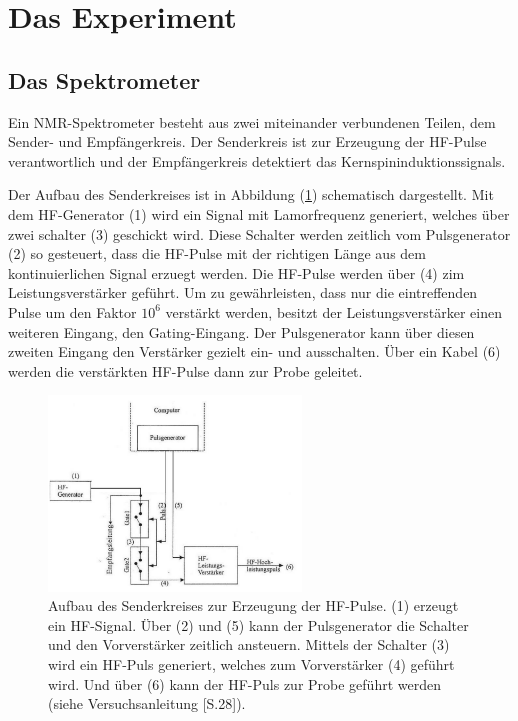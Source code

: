 \section{Das Experiment}
\subsection{Das Spektrometer}
Ein NMR-Spektrometer besteht aus zwei miteinander verbundenen Teilen, dem Sender- und Empf\"{a}ngerkreis.
Der Senderkreis ist zur Erzeugung der HF-Pulse verantwortlich und der Empf\"{a}ngerkreis detektiert das Kernspininduktionssignals.

Der Aufbau des Senderkreises ist in Abbildung (\ref{senderkreis.}) schematisch dargestellt.
Mit dem HF-Generator (1) wird ein Signal mit Lamorfrequenz generiert, welches \"{u}ber zwei schalter (3) geschickt wird.
Diese Schalter werden zeitlich vom Pulsgenerator (2) so gesteuert, dass die HF-Pulse mit der richtigen L\"{a}nge aus dem kontinuierlichen Signal erzuegt werden.
Die HF-Pulse werden \"{u}ber (4) zim Leistungsverst\"{a}rker gef\"{u}hrt.
Um zu gew\"{a}hrleisten, dass nur die eintreffenden Pulse um den Faktor $10^6$ verst\"{a}rkt werden, besitzt der Leistungsverst\"{a}rker einen weiteren Eingang, den Gating-Eingang.
Der Pulsgenerator kann \"{u}ber diesen zweiten Eingang den Verst\"{a}rker gezielt ein- und ausschalten.
\"{U}ber ein Kabel (6) werden die verst\"{a}rkten HF-Pulse dann zur Probe geleitet.
\setcounter{figure}{10}
\begin{figure}
	\centering
	\includegraphics[width=0.6\textwidth]{Plots/spektrometer.png}
	\caption{Aufbau des Senderkreises zur Erzeugung der HF-Pulse. (1) erzeugt ein HF-Signal. \"{U}ber (2) und (5) kann der Pulsgenerator die Schalter und den Vorverst\"{a}rker zeitlich ansteuern. Mittels der Schalter (3) wird ein HF-Puls generiert, welches zum Vorverst\"{a}rker (4) gef\"{u}hrt wird. Und \"{u}ber (6) kann der HF-Puls  zur Probe gef\"{u}hrt werden (siehe Versuchsanleitung \cite{Anleitung}[S.28]).}
	\label{senderkreis.}
\end{figure}

